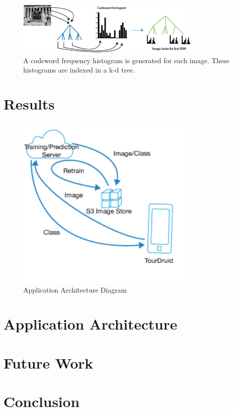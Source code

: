 \documentclass[twocolumn]{article}
\newcommand{\sectionfile}[3]{\section{#1} \label{sec:#2} }
\begin{document}
\begin{figure}
\includegraphics[width=90mm]{procedure2.png}
\caption{A codeword frequency histogram is generated for each image. These histograms are indexed in a k-d tree.}
\label{overflow}

\end{figure}
\sectionfile{Results}{results}{results.tex}

\begin{figure}
\includegraphics[width=86mm]{app_arch.png}

\caption{Application Architecture Diagram}
\label{overflow}

\end{figure}
\sectionfile{Application Architecture}{application_architecture}{application_architecture.tex}
\sectionfile{Future Work}{future_work}{future.tex}
\sectionfile{Conclusion}{conclusion}{conclusion.tex}

\nocite{*}
{\small


}
\end{document}

